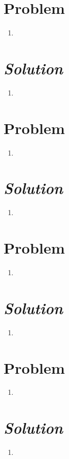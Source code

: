 \documentclass{article}
\begin{document}
\section*{Problem } 
\begin{enumerate}[label=\alph*)]
	\item %
\end{enumerate}
\section*{\textit{Solution}} 
\begin{enumerate}[label=\alph*)]
	\item %
\end{enumerate}

\section*{Problem } 
\begin{enumerate}[label=\alph*)]
	\item %
\end{enumerate}
\section*{\textit{Solution}} 
\begin{enumerate}[label=\alph*)]
	\item %
\end{enumerate}

\section*{Problem } 
\begin{enumerate}[label=\alph*)]
	\item %
\end{enumerate}
\section*{\textit{Solution}} 
\begin{enumerate}[label=\alph*)]
	\item %
\end{enumerate}

\section*{Problem } 
\begin{enumerate}[label=\alph*)]
	\item %
\end{enumerate}
\section*{\textit{Solution}} 
\begin{enumerate}[label=\alph*)]
	\item %
\end{enumerate}
\end{document}
